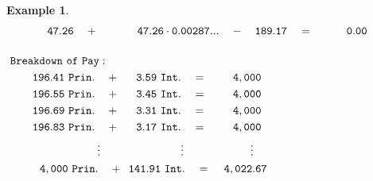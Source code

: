 \documentclass[12pt,letterpaper,oneside]{article}
\newtheorem{example}{Example}[section]
\theoremstyle{remark} %
\begin{document}
\begin{example}
\begin{align*}
	&\!\!\!\!\!\!\!\ \ \ \ \mathtt{47.26}\quad +\qquad\ \ \ \ \,\mathtt{47.26}\cdot \mathtt{0.00287...}\quad -\quad \mathtt{189.17}\quad =\quad\ \ \ \ \ \ \mathtt{0.00}\\[12pt]
	&\!\!\!\!\!\!\!\!\!\!\!\!\!\!\!\!\!\!\!\mathtt{Breakdown\ of\ Pay:}\\
	&\!\!\!\!\!\!\!\mathtt{196.41\ Prin.}\quad +\quad\;\:\mathtt{3.59\ Int.}\quad =\quad\quad\,\,\mathtt{\amount}\\
	&\!\!\!\!\!\!\!\mathtt{196.55\ Prin.}\quad +\quad\;\:\mathtt{3.45\ Int.}\quad =\quad\quad\,\,\mathtt{\amount}\\
	&\!\!\!\!\!\!\!\mathtt{196.69\ Prin.}\quad +\quad\;\:\mathtt{3.31\ Int.}\quad =\quad\quad\,\,\mathtt{\amount}\\
	&\!\!\!\!\!\!\!\mathtt{196.83\ Prin.}\quad +\quad\;\:\mathtt{3.17\ Int.}\quad =\quad\quad\,\,\mathtt{\amount}\\
	&\qquad\qquad\ \ \vdots \qquad\qquad\qquad\quad\:\vdots \qquad\qquad\quad\ \ \ \vdots\\
	&\!\!\!\!\,\mathtt{\balanceitf\ Prin.}\quad +\!\!\!\ \ \ \mathtt{141.91\ Int.}\quad =\ \ \ \,\mathtt{\amountfinal}
	\end{align*}
	\end{example}

	\normalsize
	\newpage
\end{document}
